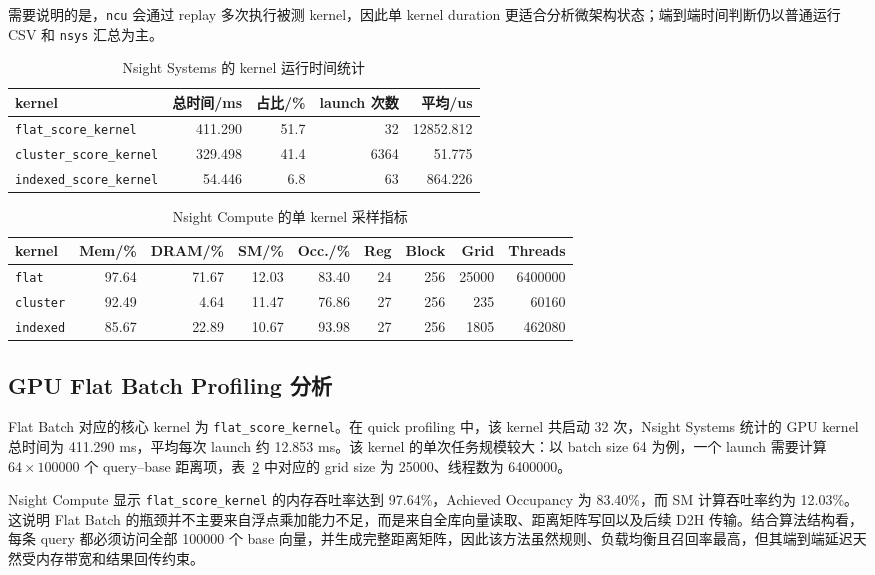 \documentclass[a4paper]{article}
\begin{document}
需要说明的是，\texttt{ncu} 会通过 replay 多次执行被测 kernel，因此单 kernel duration 更适合分析微架构状态；端到端时间判断仍以普通运行 CSV 和 \texttt{nsys} 汇总为主。

\begin{table}[H]
\centering
\small
\caption{Nsight Systems 的 kernel 运行时间统计}
\label{tab:profiling-kernel}
\begin{tabular}{lrrrr}
\toprule
kernel & 总时间/ms & 占比/\% & launch 次数 & 平均/us \\
\midrule
\texttt{flat\_score\_kernel} & 411.290 & 51.7 & 32 & 12852.812 \\
\texttt{cluster\_score\_kernel} & 329.498 & 41.4 & 6364 & 51.775 \\
\texttt{indexed\_score\_kernel} & 54.446 & 6.8 & 63 & 864.226 \\
\bottomrule
\end{tabular}
\end{table}

\begin{table}[H]
\centering
\scriptsize
\caption{Nsight Compute 的单 kernel 采样指标}
\label{tab:profiling-ncu}
\begin{tabular}{lrrrrrrrr}
\toprule
kernel & Mem/\% & DRAM/\% & SM/\% & Occ./\% & Reg & Block & Grid & Threads \\
\midrule
\texttt{flat} & 97.64 & 71.67 & 12.03 & 83.40 & 24 & 256 & 25000 & 6400000 \\
\texttt{cluster} & 92.49 & 4.64 & 11.47 & 76.86 & 27 & 256 & 235 & 60160 \\
\texttt{indexed} & 85.67 & 22.89 & 10.67 & 93.98 & 27 & 256 & 1805 & 462080 \\
\bottomrule
\end{tabular}
\end{table}

\subsection{GPU Flat Batch Profiling 分析}

Flat Batch 对应的核心 kernel 为 \texttt{flat\_score\_kernel}。在 quick profiling 中，该 kernel 共启动 32 次，Nsight Systems 统计的 GPU kernel 总时间为 411.290 ms，平均每次 launch 约 12.853 ms。该 kernel 的单次任务规模较大：以 batch size 64 为例，一个 launch 需要计算 $64\times 100000$ 个 query--base 距离项，表~\ref{tab:profiling-ncu} 中对应的 grid size 为 25000、线程数为 6400000。

Nsight Compute 显示 \texttt{flat\_score\_kernel} 的内存吞吐率达到 97.64\%，Achieved Occupancy 为 83.40\%，而 SM 计算吞吐率约为 12.03\%。这说明 Flat Batch 的瓶颈并不主要来自浮点乘加能力不足，而是来自全库向量读取、距离矩阵写回以及后续 D2H 传输。结合算法结构看，每条 query 都必须访问全部 100000 个 base 向量，并生成完整距离矩阵，因此该方法虽然规则、负载均衡且召回率最高，但其端到端延迟天然受内存带宽和结果回传约束。
\end{document}
